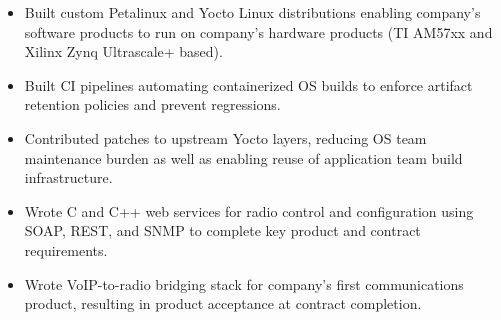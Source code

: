 \begin{itemize}
    \item Built custom Petalinux and Yocto Linux distributions enabling company's software products to run on company's hardware products (TI AM57xx and Xilinx Zynq Ultrascale+ based).
    \item Built CI pipelines automating containerized OS builds to enforce artifact retention policies and prevent regressions.
    \item Contributed patches to upstream Yocto layers, reducing OS team maintenance burden as well as enabling reuse of application team build infrastructure.
    \item Wrote C and C++ web services for radio control and configuration using SOAP, REST, and SNMP to complete key product and contract requirements.
    \item Wrote VoIP-to-radio bridging stack for company's first communications product, resulting in product acceptance at contract completion.
\end{itemize}
